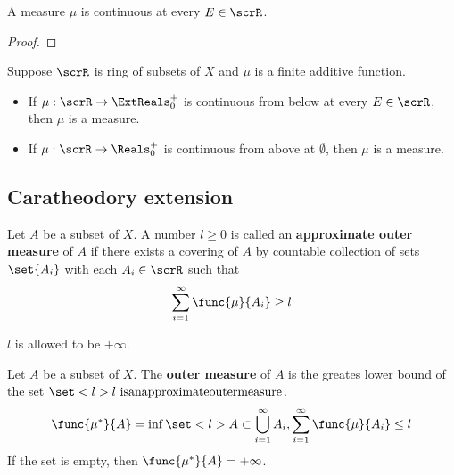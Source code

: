 \begin{theorem}
    A measure \(\mu\) is continuous at every \(E \in \scrR\). 
\end{theorem}

\begin{proof}
    
\end{proof}

\begin{proposition}
    Suppose \(\scrR\) is ring of subsets of \(X\) and \(\mu\) is a finite additive function.
    \begin{itemize}
        \item If \(\mu:\scrR \to \ExtReals^+_0\) is continuous from below at every \(E \in \scrR\), then \(\mu\) is a measure.
        \item If \(\mu:\scrR \to \Reals^+_0\) is continuous from above at  \(\emptyset\), then \(\mu\) is a measure.
    \end{itemize}
\end{proposition}

\subsection{Caratheodory extension}

\begin{definition}
    Let \(A\) be a subset of \(X\). A number \(l\geq 0\) is called an \textbf{approximate outer measure} of \(A\) if there exists a covering of \(A\) by countable collection of sets \(\set{A_i}\) with each \(A_i\in \scrR\) such that 
    \begin{equation*}
        \sum_{i = 1}^{\infty} \func{\mu}{A_i} \geq l
    \end{equation*}
\end{definition}
\begin{remark}
    \(l\) is allowed to be \(+\infty\).
\end{remark}

\begin{definition}
    Let \(A\) be a subset of \(X\). The \textbf{outer measure} of \(A\) is the greates lower bound of the set \(\set<l>{l \ \mathrm{is an approximate outer measure}}\). 
    \begin{equation*}
        \func{\mu^{\ast}}{A} =  \inf \set<l>{A \subset \bigcup_{i= 1}^{\infty} A_i, \sum_{i = 1}^{\infty} \func{\mu}{A_i} \leq l}
    \end{equation*}
    If the set is empty, then \(\func{\mu^{\ast}}{A} = + \infty\).
\end{definition}

